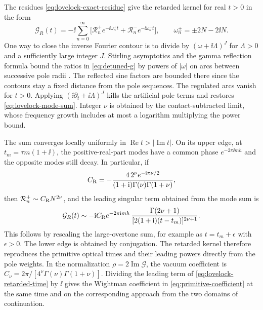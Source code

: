 The residues \eqref{eq:lovelock-exact-residue} give the
retarded kernel for real \(t>0\) in the form
\begin{equation}
 \mathcal G_R(t)=-\ii\sum_{n=0}^{\infty}
 \big[\mathcal R_n^+ e^{-\ii\omega_n^+ t}
      +\mathcal R_n^- e^{-\ii\omega_n^- t}\big],
 \qquad \omega_n^\pm=\pm 2N-2\ii N .
 \label{eq:lovelock-mode-sum}
\end{equation}
One way to close the inverse Fourier contour is to divide
by \((\omega+\ii\Lambda)^J\) for \(\Lambda>0\) and a sufficiently
large integer \(J\). Stirling asymptotics and the gamma reflection
formula bound the ratios in \eqref{eq:detuned-g} by powers of
\(|\omega|\) on arcs between successive pole radii \cite{NIST:DLMF}.
The reflected sine factors are bounded there since the
contours stay a fixed distance from the pole sequences.
The regulated arcs vanish for \(t>0\).
Applying \((\ii\partial_t+\ii\Lambda)^J\) kills the artificial
pole terms and restores \eqref{eq:lovelock-mode-sum}.
Integer \(\nu\) is obtained by the contact-subtracted limit,
whose frequency growth includes at most a logarithm multiplying
the power bound.

The sum converges locally uniformly in
\(\operatorname{Re}t>|\operatorname{Im}t|\).
On its upper edge, at \(t_m=\tau m(1+\ii)\), the
positive-real-part modes have a common phase
\(e^{-2\pi\ii m h}\) and the opposite modes still decay.
In particular, if
\begin{equation}
 C_{\rm R}=-\frac{4\,2^\nu e^{-\mathrm{i}\pi\nu/2}}
       {(1+\mathrm{i})\Gamma(\nu)\Gamma(1+\nu)} ,
\end{equation}
then \(\mathcal R_n^+\sim C_{\rm R}N^{2\nu}\), and the leading
singular term obtained from the mode sum is
\begin{equation}
 \mathcal G_R(t)\sim
 -\mathrm{i} C_{\rm R} e^{-2\pi\mathrm{i} m h}\,
 \frac{\Gamma(2\nu+1)}
 {[2(1+\mathrm{i})(t-t_m)]^{2\nu+1}} .
 \label{eq:lovelock-retarded-time}
\end{equation}
This follows by rescaling the large-overtone sum, for
example as \(t=t_m+\epsilon\) with \(\epsilon>0\).
The lower edge is obtained by conjugation. The retarded
kernel therefore reproduces the primitive optical times
and their leading powers directly from the pole weights.
In the normalization \(\rho=2\operatorname{Im}\mathcal G\),
the vacuum coefficient is
\(C_\nu=2\pi/[4^\nu\Gamma(\nu)\Gamma(1+\nu)]\).
Dividing the leading term of \eqref{eq:lovelock-retarded-time}
by \(\ii\) gives the Wightman coefficient in
\eqref{eq:primitive-coefficient} at the same time and on the
corresponding approach from the two domains of continuation.

